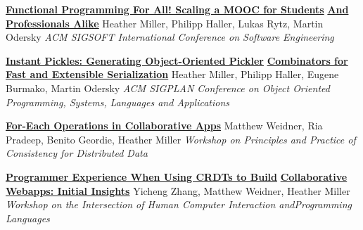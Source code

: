 \documentclass[9pt]{article}
\begin{document}
\noindent\href{http://infoscience.epfl.ch/record/190022}{\bf Functional Programming For All! Scaling a MOOC for Students}\vspace{-0.03in}
\newline\noindent\href{http://infoscience.epfl.ch/record/190022}{\bf And Professionals Alike}
\newline\noindent Heather Miller, Philipp Haller, Lukas Rytz, Martin Odersky
\newline\noindent\emph{ACM SIGSOFT International Conference on Software Engineering}
\bigskip

\noindent\href{http://infoscience.epfl.ch/record/188383}{\bf Instant Pickles: Generating Object-Oriented Pickler}\vspace{-0.03in}
\newline\noindent\href{http://infoscience.epfl.ch/record/188383}{\bf Combinators for Fast and Extensible Serialization}
\newline\noindent Heather Miller, Philipp Haller, Eugene Burmako, Martin Odersky
\newline\noindent\emph{ACM SIGPLAN Conference on Object Oriented Programming, Systems,}
\newline\noindent\emph{Languages and Applications}
\bigskip



\noindent\href{https://dl.acm.org/doi/10.1145/3578358.3591323}{\bf For-Each Operations in Collaborative Apps}
\newline\noindent Matthew Weidner, Ria Pradeep, Benito Geordie, Heather Miller
\newline\noindent\emph{Workshop on Principles and Practice of Consistency for Distributed Data}
\bigskip

\noindent\href{https://kilthub.cmu.edu/articles/conference_contribution/Programmer_Experience_When_Using_CRDTs_to_Build_Collaborative_Webapps_Initial_Insights/22277341/1}{\bf Programmer Experience When Using CRDTs to Build}\vspace{-0.03in}
\newline\noindent\href{https://kilthub.cmu.edu/articles/conference_contribution/Programmer_Experience_When_Using_CRDTs_to_Build_Collaborative_Webapps_Initial_Insights/22277341/1}{\bf Collaborative Webapps: Initial Insights}
\newline\noindent Yicheng Zhang, Matthew Weidner, Heather Miller
\newline\noindent\emph{Workshop on the Intersection of Human Computer Interaction and}\vspace{-0.03in}\newline\noindent\emph{Programming Languages}
\bigskip
\end{document}
